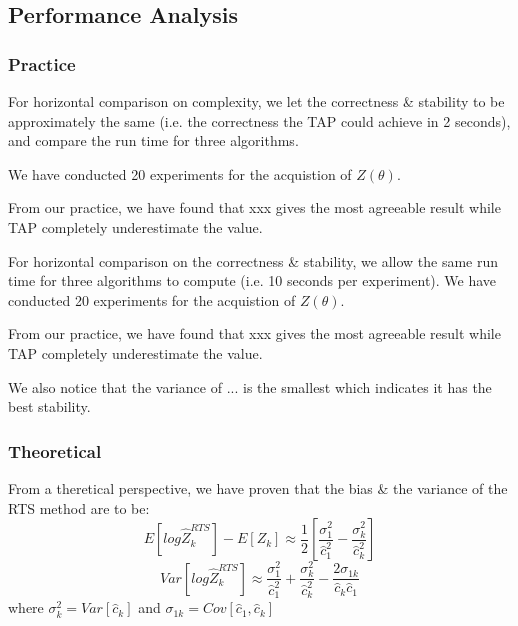 



\subsection{Performance Analysis}


\subsubsection{Practice}
For horizontal comparison on complexity, we let the correctness \& stability to be approximately the same (i.e. the correctness the TAP could achieve in 2 seconds), and compare the run time for three algorithms.

We have conducted 20 experiments for the acquistion of $Z(\theta)$.

From our practice, we have found that xxx gives the most agreeable result while TAP completely underestimate the value.


For horizontal comparison on the correctness \& stability, we allow the same run time for three algorithms to compute (i.e. 10 seconds per experiment). We have conducted 20 experiments for the acquistion of $Z(\theta)$.

From our practice, we have found that xxx gives the most agreeable result while TAP completely underestimate the value.

We also notice that the variance of ... is the smallest which indicates it has the best stability.



\subsubsection{Theoretical}
From a theretical perspective, we have proven that the bias \& the variance of the RTS method are to be:
\begin{equation}
E{[ log \hat{Z}_{k}^{RTS} ]} - E{[Z_{k}]} \approx \frac{1}{2}{[\frac{\sigma^{2}_{1}}{\hat{c}^{2}_{1}}-\frac{\sigma^{2}_{k}}{\hat{c}^{2}_{k}}]} 
\end{equation}
\begin{equation}
Var{[ log \hat{Z}_{k}^{RTS} ]} \approx \frac{\sigma^{2}_{1}}{\hat{c}^{2}_{1}} + \frac{\sigma^{2}_{k}}{\hat{c}^{2}_{k}} - \frac{2\sigma_{1k}}{\hat{c}_{k}\hat{c}_{1}}
\end{equation}
where $\sigma^{2}_{k} = Var{[\hat{c}_{k}]}$ and $\sigma_{1k} = Cov{[\hat{c}_{1},\hat{c}_{k}]}$

